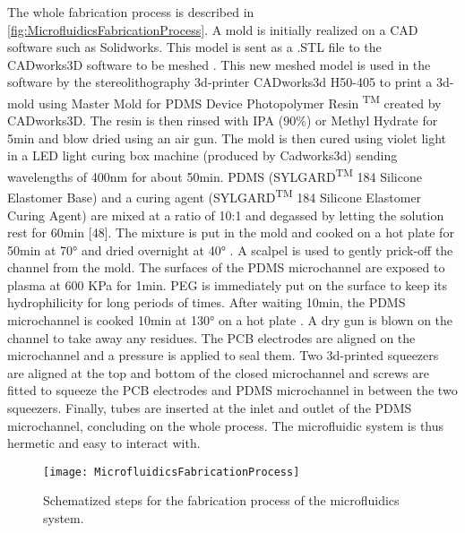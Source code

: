 The whole fabrication process is described in \autoref{fig:MicrofluidicsFabricationProcess}. A mold is initially realized on a CAD software such as Solidworks. This model is sent as a .STL file to the CADworks3D software to be meshed \cite{Cadworks3d}. This new meshed model is used in the software by the stereolithography 3d-printer CADworks3d H50-405 to print a 3d-mold using Master Mold for PDMS Device Photopolymer Resin \textsuperscript{TM} created by CADworks3D. The resin is then rinsed with IPA (90\%) or Methyl Hydrate for 5min and blow dried using an air gun. The mold is then cured using violet light in a LED light curing box machine (produced by Cadworks3d) sending wavelengths of 400nm for about 50min. PDMS (SYLGARD\textsuperscript{TM} 184 Silicone Elastomer Base) and a curing agent (SYLGARD\textsuperscript{TM} 184 Silicone Elastomer Curing Agent) are mixed at a ratio of 10:1 and degassed by letting the solution rest for 60min [48]. The mixture is put in the mold and cooked on a hot plate for 50min at 70° and dried overnight at 40° \cite{Trantidou2017}. A scalpel is used to gently prick-off the channel from the mold. The surfaces of the PDMS microchannel are exposed to plasma at 600 KPa for 1min. PEG is immediately put on the surface to keep its hydrophilicity for long periods of times. After waiting 10min, the PDMS microchannel is cooked 10min at 130° on a hot plate \cite{Trantidou2017}. A dry gun is blown on the channel to take away any residues. The PCB electrodes are aligned on the microchannel and a pressure is applied to seal them. Two 3d-printed squeezers are aligned at the top and bottom of the closed microchannel and screws are fitted to squeeze the PCB electrodes and PDMS microchannel in between the two squeezers. Finally, tubes are inserted at the inlet and outlet of the PDMS microchannel, concluding on the whole process. The microfluidic system is thus hermetic and easy to interact with. \par 
\begin{figure}[h]
    \centering
    \texttt{[image: MicrofluidicsFabricationProcess]}
    \caption{Schematized steps for the fabrication process of the microfluidics system.}
    \label{fig:MicrofluidicsFabricationProcess}
\end{figure}

